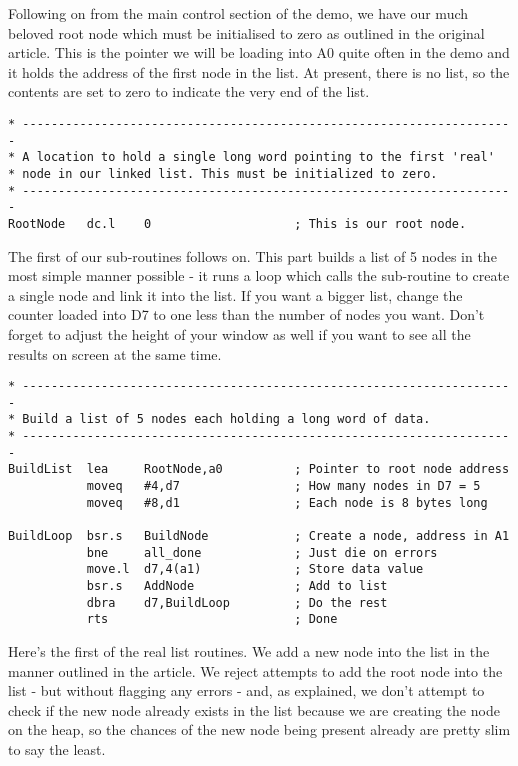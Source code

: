 Following on from the main control section of the demo, we have our
    much beloved root node which must be initialised to zero as outlined in
    the original article. This is the pointer we will be loading into A0 quite
    often in the demo and it holds the address of the first node in the list.
    At present, there is no list, so the contents are set to zero to indicate
    the very end of the list.

\begin{lstlisting}[firstnumber=last,caption={Single Linked List - Demo Code - Root Node}]
* ---------------------------------------------------------------------
* A location to hold a single long word pointing to the first 'real'
* node in our linked list. This must be initialized to zero.
* ---------------------------------------------------------------------
RootNode   dc.l    0                    ; This is our root node.
\end{lstlisting}

The first of our sub-{}routines follows on. This part builds a list of
    5 nodes in the most simple manner possible -{} it runs a loop which calls
    the sub-{}routine to create a single node and link it into the list. If you
    want a bigger list, change the counter loaded into D7 to one less than the
    number of nodes you want. Don't forget to adjust the height of your window
    as well if you want to see all the results on screen at the same
    time.

\begin{lstlisting}[firstnumber=last,caption={Single Linked List - Demo Code - Build List}]
* ---------------------------------------------------------------------
* Build a list of 5 nodes each holding a long word of data.
* ---------------------------------------------------------------------
BuildList  lea     RootNode,a0          ; Pointer to root node address
           moveq   #4,d7                ; How many nodes in D7 = 5
           moveq   #8,d1                ; Each node is 8 bytes long

BuildLoop  bsr.s   BuildNode            ; Create a node, address in A1
           bne     all_done             ; Just die on errors
           move.l  d7,4(a1)             ; Store data value
           bsr.s   AddNode              ; Add to list
           dbra    d7,BuildLoop         ; Do the rest
           rts                          ; Done
\end{lstlisting}

Here's the first of the real list routines. We add a new node into
    the list in the manner outlined in the article. We reject attempts to add
    the root node into the list -{} but without flagging any errors -{} and, as
    explained, we don't attempt to check if the new node already exists in the
    list because we are creating the node on the heap, so the chances of the
    new node being present already are pretty slim to say the least.

